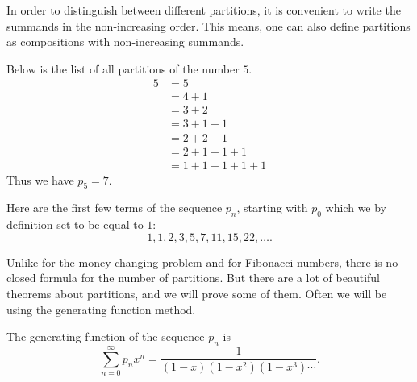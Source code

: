 \begin{page}

In order to distinguish between different partitions, it is convenient to write the summands in the non-increasing order.
This means, one can also define partitions as compositions with non-increasing summands.


\end{page}

\begin{page}

\begin{exl}
Below is the list of all partitions of the number $5$.
\begin{align*}
5 &= 5\\
&= 4+1\\
&= 3+2\\
&= 3+1+1\\
&= 2+2+1\\
&= 2+1+1+1\\
&= 1+1+1+1+1
\end{align*}
Thus we have $p_5=7$.
\end{exl}

\end{page}

\begin{page}


Here are the first few terms of the sequence $p_n$, starting with $p_0$ which we by definition set to be equal to $1$:
\[
1, 1, 2, 3, 5, 7, 11, 15, 22, \ldots.
\]



Unlike for the money changing problem and for Fibonacci numbers, there is no closed formula for the number of partitions.
But there are a lot of beautiful theorems about partitions, and we will prove some of them.
Often we will be using the generating function method.


\end{page}

\begin{page}

\begin{thm}
The generating function of the sequence $p_n$ is
\[
\sum_{n=0}^\infty p_n x^n = \frac{1}{(1-x)(1-x^2)(1-x^3)\cdots}.
\]
\end{thm}

\end{page}

